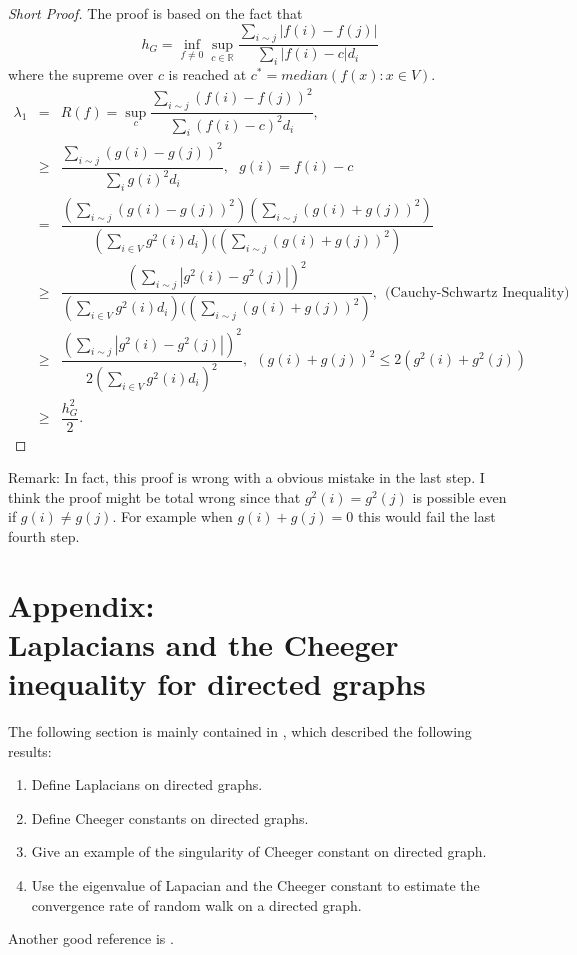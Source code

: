 \documentclass[twoside]{article}
\theoremstyle{definition}
\theoremstyle{definition}
\theoremstyle{remark}
\def\R{{\mathbb R}}
\begin{document}
\begin{proof}[Short Proof]
The proof is based on the fact that
\[ h_G = \inf_{f\neq 0} \sup_{c\in \R} \frac{\sum_{i\sim j} |f(i) - f(j)|}{\sum_i |f(i) -c|d_i} \]
where the supreme over $c$ is reached at $c^*=median(f(x):x\in V)$.
\begin{eqnarray*}
\lambda_1 & =& R(f)=\sup_c \dfrac{\sum_{i\sim j}(f(i) - f(j))^2}{\sum_{i}(f(i)-c)^2 d_i},  \\
& \geq  &\dfrac{\sum_{i\sim j}(g(i) - g(j))^2}{\sum_{i}g(i)^2 d_i}, \ \ \ g(i)=f(i)-c\\
& = & \dfrac{(\sum_{i\sim j}(g(i) - g(j))^2)(\sum_{i\sim j}(g(i) +g(j))^2)}{(\sum_{i\in V}g^2(i)d_i)((\sum_{i\sim j}(g(i) +g(j))^2)} \\
& \ge & \dfrac{(\sum_{i\sim j}|g^2(i) - g^2(j)|)^2}{(\sum_{i\in V}g^2(i)d_i)((\sum_{i\sim j}(g(i) +g(j))^2)} , \ \ \textrm{(Cauchy-Schwartz Inequality)} \\
& \ge & \dfrac{(\sum_{i\sim j}|g^2(i) - g^2(j)|)^2}{2( \sum_{i\in V}g^2(i)d_i)^2} , \ \ \textrm{$(g(i)+g(j))^2\leq 2 (g^2(i)+g^2(j))$} \\
& \ge & \dfrac{h_G^2}{2}.
\end{eqnarray*}
\end{proof}

Remark:  In fact, this proof is wrong with a obvious mistake in the last step.  I think the proof might be total wrong since that $g^2 (i)=g^2 (j)$ is possible even if $g(i)\neq g(j)$. For example when $g(i)+g(j)=0$ this would fail the last fourth step.

%

\section{Appendix:\\
Laplacians and the Cheeger inequality for directed graphs}
  The following section is mainly contained in \cite{Chung05}, which described the following results:
  \begin{enumerate}
    \item Define Laplacians on directed graphs.
    \item Define Cheeger constants on directed graphs.
    \item Give an example of the singularity of Cheeger constant on directed graph.
    \item Use the eigenvalue of Lapacian and the Cheeger constant to estimate the convergence rate of random walk on a directed graph.
  \end{enumerate}
  Another good reference is \cite{LiZha10}.
\end{document}
